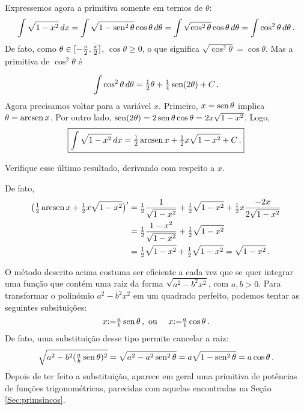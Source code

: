 Expressemos agora a primitiva somente em termos de $\theta$:
$$
\int \sqrt{1-x^2}\,dx=\int \sqrt{1-\operatorname{sen}^2\theta}\cos \theta\,d\theta=
\int \sqrt{\cos^2\theta}\cos \theta\,d\theta=\int \cos^2\theta\,d\theta\,.
$$
De fato, como $\theta\in [-\tfrac{\pi}{2},\tfrac{\pi}{2}]$, 
$\cos \theta\geq 0$, o que
significa $\sqrt{\cos^2\theta}=\cos \theta$. Mas a primitiva de $\cos^2\theta$ é

$$
\int\cos^2\theta\,d\theta=\tfrac{1}{2}\theta+\tfrac{1}{4}\operatorname{sen} (2\theta)+C\,.
$$
Agora precisamos voltar para a variável $x$. Primeiro,
$x=\operatorname{sen} \theta$ implica $\theta=\operatorname{arcsen} x$. Por outro lado, $\operatorname{sen}
(2\theta)=2\operatorname{sen} \theta\cos\theta=2x\sqrt{1-x^2}$. Logo, 
$$
\boxed{\int \sqrt{1-x^2}\,dx=\tfrac12\operatorname{arcsen}
x+\tfrac12x\sqrt{1-x^2}+C\,.}
$$

\begin{exo}
Verifique esse último resultado, derivando com respeito a $x$.
\begin{sol}
De fato,
\begin{align*}
\bigl(\tfrac12\operatorname{arcsen} x+\tfrac12x\sqrt{1-x^2}\bigr)'&=
\tfrac12\frac{1}{\sqrt{1-x^2}}+\tfrac12
\sqrt{1-x^2}+\tfrac12 x\frac{-2x}{2\sqrt{1-x^2}} \\
&=\tfrac12\frac{1-x^2}{\sqrt{1-x^2}}+\tfrac12
\sqrt{1-x^2}\\
&=\tfrac12 \sqrt{1-x^2}+\tfrac12 \sqrt{1-x^2}=\sqrt{1-x^2}\,.
\end{align*}
\end{sol}
\end{exo}

O método descrito acima costuma ser eficiente
a cada vez que se quer integrar uma função 
que contém uma raiz da forma $\sqrt{a^2-b^2x^2}$, com $a,b>0$.
Para transformar o polinómio $a^2-b^2x^2$ em um quadrado perfeito, podemos
tentar as seguintes subsituições: 
$$x{:=} \tfrac{a}{b}\operatorname{sen} \theta\,,\text{  ou  }\quad x{:=}
\tfrac{a}{b}\cos \theta\,.$$
De fato, uma substituição desse tipo permite cancelar a raiz:
$$
\sqrt{a^2-b^2(\tfrac{a}{b}\operatorname{sen} \theta)^2}=
\sqrt{a^2-a^2\operatorname{sen}^2\theta}=a\sqrt{1-\operatorname{sen}^2\theta}=a\cos \theta\,.
$$
Depois de ter feito a substituição, aparece em geral uma primitiva 
de potências de funções trigonométricas, parecidas com aquelas encontradas na
Seção \ref{Sec:primsincos}.

